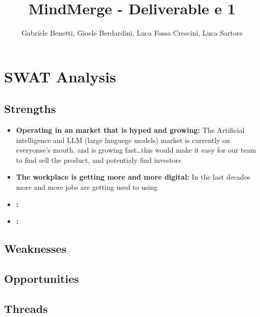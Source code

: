 \documentclass{article}
\title{MindMerge - Deliverable e 1}
\author{Gabriele Benetti, Gioele Berdardini, Luca Fossa Crescini, Luca Sartore}
\begin{document}
\maketitle


\tableofcontents

\section{SWAT Analysis}
\subsection{Strengths}
\begin{itemize}
    \item \textbf{Operating in an market that is hyped and growing: }
    The Artificial intelligence and LLM (large languege models) market is currently on everyonse's mouth.
    and is growing fast\dots this would make it easy for our team to find sell the product, and potentialy find investors 

    \item \textbf{The workplace is getting more and more digital: }
    In the last decades more and more jobs are getting used to using 

    \item \textbf{: }
    \item \textbf{: }


\end{itemize}
\subsection{Weaknesses}

\subsection{Opportunities}

\subsection{Threads}
\end{document}

